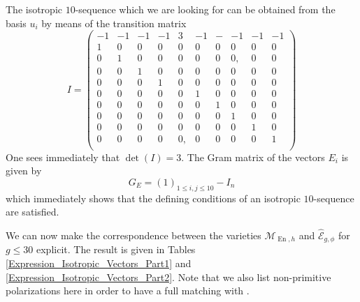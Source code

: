 \documentclass[a4paper,11pt]{article}
\newcommand{\cE}{\mathcal E}
\newcommand{\cM}{\mathcal M}
\newcommand{\En}{\mathop{\mathrm {En}}\nolimits}
\begin{document}
The isotropic $10$-sequence which we are looking for can be obtained from the basis $u_i$ by means of the transition matrix
\begin{equation}\label{isotropic10}
I =
\left(\begin{array}{cccccccccc}
 -1 &  -1 &  -1 &  -1 &   3 &  -1 &  -&  -1 &  -1 &  -1\\
  1 &   0 &   0 &   0 &   0 &   0 &   0 &   0 &   0 &  0 \\
  0 &   1 &   0 &   0 &   0 &   0 &   0 &   0, &   0 &   0 \\
  0 &   0 &   1 &   0 &   0 &   0 &   0 &   0 &   0 &   0 \\
  0&   0&   0&   1&   0&   0&   0&   0&   0&   0 \\
  0&   0&   0&   0&   0&   1&   0&   0&   0&   0 \\
  0&   0&   0&   0&   0&   0&   1&   0&   0&   0 \\
  0&   0&   0&   0&   0&   0&   0&   1&   0&   0 \\
  0&   0&   0&   0 &   0&   0&   0&   0&   1&   0 \\
  0&   0&   0&   0&   0,&   0&   0&   0&   0&   1 \\
\end{array}\right)
\end{equation}
One sees immediately that $\det(I)=3$. The Gram matrix of the vectors $E_i$ is given by
\begin{equation}\label{GramE}
G_E = (1)_{1\leq i,j\leq 10} - I_n
\end{equation}
which immediately shows that the defining conditions of an isotropic $10$-sequence are satisfied.

We can now make the correspondence between the varieties $\cM_{\En,h}$ and $\widehat{\cE}_{g,\phi}$ for $g \leq 30$ explicit.
The result is given in Tables \ref{Expression_Isotropic_Vectors_Part1} and \ref{Expression_Isotropic_Vectors_Part2}. Note that we also list non-primitive polarizations here in order to have a full matching with
 \cite[Appendix]{CDGK}.
\end{document}
